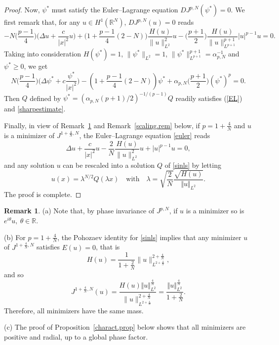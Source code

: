 \documentclass[reqno]{amsart}
\newcommand{\real}{\mathbb{R}}
\newcommand{\rn}{\real^N}
\newcommand{\R}{\mathbb{R}}
\let\ge= \geqslant
\theoremstyle{plain}
\theoremstyle{definition}
\newtheorem{remark}{Remark}
\numberwithin{equation}{section}
\begin{document}
\begin{proof}
Now, $\psi^*$ must satisfy the Euler--Lagrange equation $DJ^{p,N}(\psi^*)=0$.
We first remark that, for any $u \in H^1(\rn)$, $DJ^{p,N}(u)=0$ reads
\begin{equation}\label{euler}
-N\Big(\frac{p-1}{4}\Big)\Big(\Delta u + \frac{c}{|x|^2} u\Big)
+\Big(1+ \frac{p-1}{4}(2-N)\Big)\frac{H(u)}{\|u\|_{L^2}^2} u
-\Big(\frac{p+1}{2}\Big) \frac{H(u)}{\|u\|_{L^{p+1}}^{p+1}}|u|^{p-1}u=0.
\end{equation}
Taking into consideration $H(\psi^*)=1$, $\| \psi^*\|_{L^2}=1$, 
$\|\psi^*\|^{p+1}_{L^{p+1}}=\alpha_{p,N}^{-1}$ and $\psi^*\ge0$, we get
\[
N\Big(\frac{p-1}{4}\Big)\Big(\Delta \psi^*+c\frac{\psi^*}{|x|^2}\Big)
-\left(1+\frac{p-1}{4}(2-N) \right)\psi^*+\alpha_{p,N}\Big(\frac{p+1}{2}\Big)(\psi^*)^p=0.
\]
Then $Q$ defined by $\psi^*=(\alpha_{p,N}(p+1)/2)^{-1/(p-1)}Q$ readily satisfies (\ref{EL})
and \eqref{sharpestimate}.

Finally, in view of Remark~\ref{gs_scaling.rem} and Remark~\ref{scaling.rem} below,  
if $p=1+\frac4N$ and $u$ is a minimizer of $J^{1+\frac{4}{N},N}$,
the Euler--Lagrange equation \eqref{euler} reads
\begin{equation}\label{euler2}
\Delta u + \frac{c}{|x|^2} u
-\frac{2}{N}\frac{H(u)}{\|u\|_{L^2}^2} u +|u|^{p-1}u=0,
\end{equation}
and any solution $u$
can be rescaled into a solution $Q$ of \eqref{sinls} by letting
\[
u(x)=\lambda^{N/2}Q(\lambda x) \quad\text{with}\quad 
\lambda=\sqrt{\frac{2}{N}}\frac{\sqrt{H(u)}}{\Vert u\Vert_{L^2}}.
\]
The proof is complete.
\end{proof}

\begin{remark}\label{gs_scaling.rem}
\noindent
(a) Note that, by phase invariance of $J^{p,N}$, if $u$ is a minimizer so is 
$e^{i\theta}u, \ \theta\in\R$.

\medskip
\noindent
(b) For $p=1+\frac{4}{N}$, the Pohozaev identity for \eqref{sinls} implies
that any minimizer $u$ of $J^{1+\frac{4}{N},N}$ satisfies $E(u)=0$, that is 
\[
H(u)=\frac{1}{1+\frac{2}{N}}\|u\|_{L^{2+\frac{4}{N}}}^{2+\frac{4}{N}},
\]
and so
\begin{equation}\label{valueofmin}
J^{1+\frac{4}{N},N}(u)
=\frac{H(u)\Vert u\Vert_{L^2}^{\frac{4}{N}}}{\|u\|_{L^{2+\frac{4}{N}}}^{2+\frac{4}{N}}}
=\frac{\Vert u\Vert_{L^2}^{\frac{4}{N}}}{1+\frac{2}{N}}.
\end{equation}
Therefore, all minimizers have the same mass. 

\medskip
\noindent (c) The proof of Proposition~\ref{charact.prop} below shows
that all minimizers are positive and radial, up to a global phase factor.
\end{remark}
\end{document}

